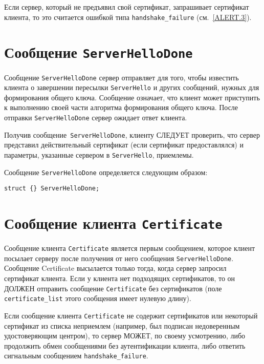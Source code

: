 \begin{note*}
Если сервер, который не предъявил свой сертификат, запрашивает сертификат
клиента, то это считается ошибкой типа  \lstinline{handshake_failure}
(см.~\ref{ALERT.3}).
\end{note*}  

\section{Сообщение \lstinline{ServerHelloDone}}\label{HANDSHAKE.11}

Сообщение \lstinline{ServerHelloDone} сервер отправляет для того, чтобы
известить клиента о завершении пересылки \lstinline{ServerHello} и других
сообщений, нужных для формирования общего ключа. Сообщение означает, что
клиент может приступить к выполнению своей части алгоритма формирования
общего ключа. После отправки \lstinline{ServerHelloDone} сервер ожидает
ответ клиента.

Получив сообщение~\lstinline{ServerHelloDone}, клиенту СЛЕДУЕТ проверить,
что сервер представил действительный сертификат (если сертификат
предоставлялся) и параметры, указанные сервером в \lstinline{ServerHello},
приемлемы.

Сообщение \lstinline{ServerHelloDone} определяется следующим образом:
\begin{lstlisting}
struct {} ServerHelloDone;
\end{lstlisting}

\section{Сообщение клиента \lstinline{Certificate}}\label{HANDSHAKE.12}

Сообщение клиента \lstinline{Certificate} является первым сообщением,
которое клиент посылает серверу после получения от него сообщения
\lstinline{ServerHelloDone}. Сообщение Certificate высылается только тогда,
когда сервер запросил сертификат клиента. Если у клиента нет подходящих
сертификатов, то он ДОЛЖЕН отправить сообщение \lstinline{Certificate} без
сертификатов (поле \lstinline{certificate_list} этого сообщения имеет
нулевую длину).

Если сообщение клиента \lstinline{Certificate} не содержит сертификатов или
некоторый сертификат из списка неприемлем (например, был подписан
недоверенным удостоверяющим центром), то сервер МОЖЕТ, по своему
усмотрению, либо продолжить обмен сообщениями без аутентификации клиента,
либо ответить сигнальным сообщением \lstinline{handshake_failure}.

